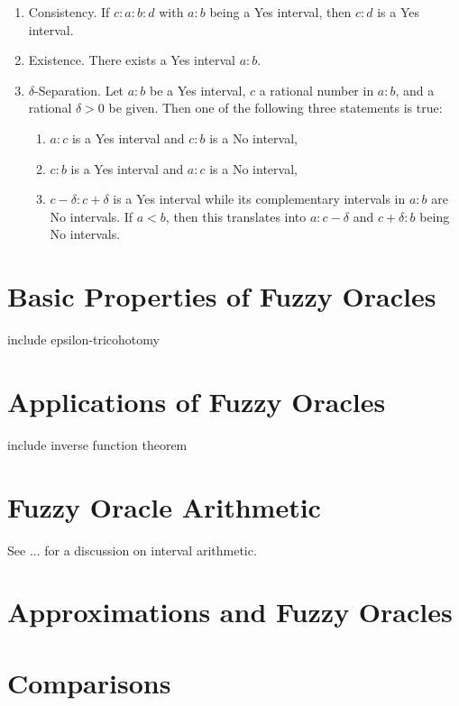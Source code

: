 \documentclass[12pt]{article}
\begin{document}
\begin{enumerate}
    \item Consistency. If $c:a:b:d$ with $a:b$ being a Yes interval, then $c:d$ is a Yes interval. 
    \item Existence. There exists a Yes interval $a:b$.
    \item $\delta$-Separation. Let $a:b$ be a Yes interval, $c$ a rational number in $a:b$, and a rational $\delta > 0$ be given. Then one of the following three statements is true: 
    \begin{enumerate}
        \item $a:c$ is a Yes interval and $c:b$ is a No interval,
        \item $c:b$ is a Yes interval and $a:c$ is a No interval, 
        \item $c-\delta:c+\delta$ is a Yes interval while its complementary intervals in $a:b$ are No intervals. If $a\lt b$, then this translates into $a:c-\delta$ and $c+\delta:b$ being No intervals. 
    \end{enumerate}
\end{enumerate}



\section{Basic Properties of Fuzzy Oracles}

include epsilon-tricohotomy

\section{Applications of Fuzzy Oracles}

include inverse function theorem


\section{Fuzzy Oracle Arithmetic}

See ... for a discussion on interval arithmetic.

\section{Approximations and Fuzzy Oracles}



\section{Comparisons}


\medskip

\normalem %

\printbibliography
\end{document}
